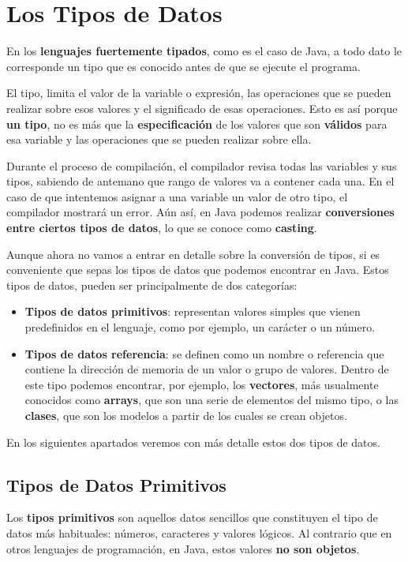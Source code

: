 \section{Los Tipos de Datos}
En los \textbf{lenguajes fuertemente tipados}, como es el caso de Java, a todo dato le corresponde un tipo que es conocido antes de que se ejecute el programa.

El tipo, limita el valor de la variable o expresión, las operaciones que se pueden realizar sobre esos valores y el significado de esas operaciones. Esto es así porque \textbf{un tipo}, no es más que la \textbf{especificación} de los valores que son \textbf{válidos} para esa variable y las operaciones que se pueden realizar sobre ella.

Durante el proceso de compilación, el compilador revisa todas las variables y sus tipos, sabiendo de antemano que rango de valores va a contener cada una. En el caso de que intentemos asignar a una variable un valor de otro tipo, el compilador mostrará un error. Aún así, en Java podemos realizar \textbf{conversiones entre ciertos tipos de datos}, lo que se conoce como \textbf{casting}.

Aunque ahora no vamos a entrar en detalle sobre la conversión de tipos, si es conveniente que sepas los tipos de datos que podemos encontrar en Java. Estos tipos de datos, pueden ser principalmente de dos categorías:

\begin{itemize}
    \item \textbf{Tipos de datos primitivos}: representan valores simples que vienen predefinidos en el lenguaje, como por ejemplo, un carácter o un número.

    \item \textbf{Tipos de datos referencia}: se definen como un nombre o referencia que contiene la dirección de memoria de un valor o grupo de valores. Dentro de este tipo podemos encontrar, por ejemplo, los \textbf{vectores}, más usualmente conocidos como \textbf{arrays}, que son una serie de elementos del mismo tipo, o las \textbf{clases}, que son los modelos a partir de los cuales se crean objetos.
\end{itemize}

En los siguientes apartados veremos con más detalle estos dos tipos de datos.

\subsection{Tipos de Datos Primitivos}
Los \textbf{tipos primitivos} son aquellos datos sencillos que constituyen el tipo de datos más habituales: números, caracteres y valores lógicos. Al contrario que en otros lenguajes de programación, en Java, estos valores \textbf{no son objetos}.

